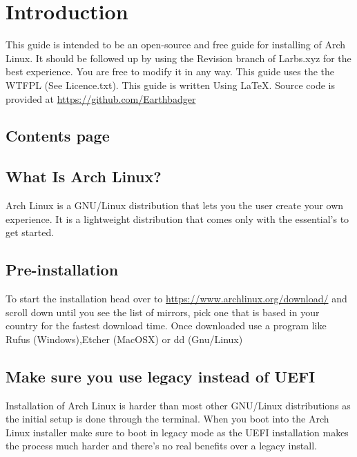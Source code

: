 \documentclass[titlepage]{article}
\begin{document}
\section*{Introduction}
This guide is intended to be an open-source and free guide for installing of Arch Linux. It should be followed up by using the Revision branch of Larbs.xyz for the best experience. You are free to modify it in any way.
This guide uses the the WTFPL (See Licence.txt). This guide is written Using {\LaTeX}. Source code is provided at \url{https://github.com/Earthbadger}

\newpage
\begin{centering}
\section*{Contents page}
\end{centering}
\tableofcontents
\newpage
\begin{centering}
\section{What Is Arch Linux?}
     \end{centering}
     Arch Linux is a GNU/Linux distribution that lets you the user create your own experience. It is a lightweight distribution that comes only with the essential's to get started.
\newpage
\begin{centering}
\section{Pre-installation}
\end{centering}
   To start the installation head over to \url{https://www.archlinux.org/download/} and scroll down until you see the list of mirrors, pick one that is based in your country for the fastest download time. Once downloaded use a program like Rufus (Windows),Etcher (MacOSX) or dd (Gnu/Linux)\\
    \vspace*{0.5 cm}
   \subsection{Make sure you use legacy instead of UEFI}
   Installation of Arch Linux is harder than most other GNU/Linux distributions as the initial setup is done through the terminal. When you boot into the Arch Linux installer make sure to boot in legacy mode as the UEFI installation makes the process much harder and there's no real benefits over a legacy install.\\
   \vspace*{0.5 cm}
\end{document}

